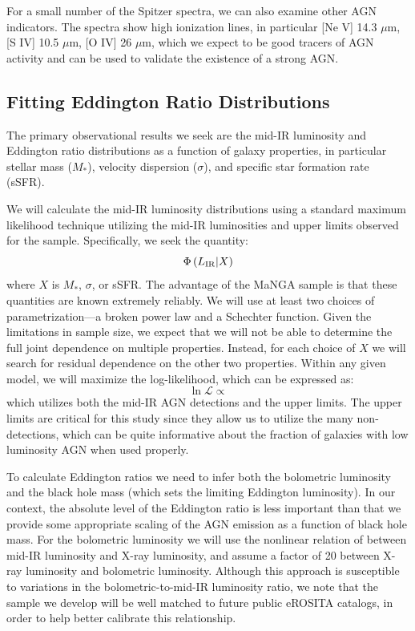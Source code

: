 \documentclass[12pt, preprint]{hacked-aastex}
\begin{document}
For a small number of the Spitzer spectra, we can also examine other
AGN indicators. The spectra show high ionization lines, in particular
[Ne V] 14.3 $\mu$m, [S IV] 10.5 $\mu$m, [O IV] 26 $\mu$m, which we
expect to be good tracers of AGN activity and can be used to validate
the existence of a strong AGN.

\subsection{Fitting Eddington Ratio Distributions}
\label{sec:erd}

The primary observational results we seek are the mid-IR luminosity
and Eddington ratio distributions as a function of galaxy properties,
in particular stellar mass ($M_\ast$), velocity dispersion ($\sigma$),
and specific star formation rate (sSFR).

We will calculate the mid-IR luminosity distributions using a standard
maximum likelihood technique utilizing the mid-IR luminosities and
upper limits observed for the sample. Specifically, we seek the
quantity:
\begin{equation}
\Phi\left(L_{\rm IR} | X\right)
\end{equation}
where $X$ is $M_\ast$, $\sigma$, or sSFR. The advantage of the MaNGA
sample is that these quantities are known extremely reliably. We will
use at least two choices of parametrization---a broken power law and a
Schechter function. Given the limitations in sample size, we expect
that we will not be able to determine the full joint dependence on
multiple properties. Instead, for each choice of $X$ we will search
for residual dependence on the other two properties. Within any given
model, we will maximize the log-likelihood, which can be expressed as:
\begin{equation}
\ln \mathcal{L} \propto 
\end{equation}
which utilizes both the mid-IR AGN detections and the upper
limits. The upper limits are critical for this study since they allow
us to utilize the many non-detections, which can be quite informative
about the fraction of galaxies with low luminosity AGN when used
properly.

To calculate Eddington ratios we need to infer both the bolometric
luminosity and the black hole mass (which sets the limiting Eddington
luminosity). In our context, the absolute level of the Eddington ratio
is less important than that we provide some appropriate scaling of the
AGN emission as a function of black hole mass.  For the bolometric
luminosity we will use the nonlinear relation of \cite{stern15a}
between mid-IR luminosity and X-ray luminosity, and assume a factor of
20 between X-ray luminosity and bolometric luminosity. Although this
approach is susceptible to variations in the bolometric-to-mid-IR
luminosity ratio, we note that the sample we develop will be well
matched to future public eROSITA catalogs, in order to help better
calibrate this relationship.
\end{document}
